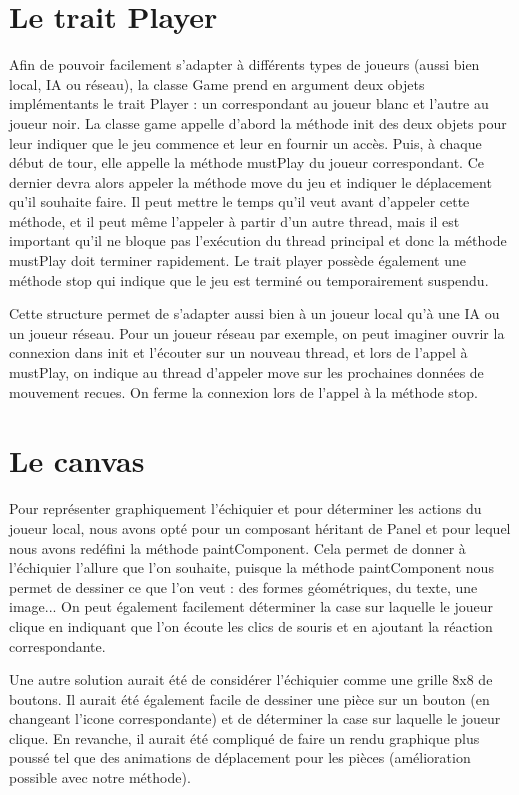 \documentclass[11pt]{article}
\begin{document}
\section{Le trait Player}

Afin de pouvoir facilement s'adapter à différents types de joueurs (aussi bien local, IA ou réseau), la classe Game prend en argument deux objets implémentants le trait Player : un correspondant au joueur blanc et l'autre au joueur noir.
La classe game appelle d'abord la méthode init des deux objets pour leur indiquer que le jeu commence et leur en fournir un accès.
Puis, à chaque début de tour, elle appelle la méthode mustPlay du joueur correspondant. Ce dernier devra alors appeler la méthode move du jeu et indiquer le déplacement qu'il souhaite faire. Il peut mettre le temps qu'il veut avant d'appeler cette méthode, et il peut même l'appeler à partir d'un autre thread, mais il est important qu'il ne bloque pas l'exécution du thread principal et donc la méthode mustPlay doit terminer rapidement.
Le trait player possède également une méthode stop qui indique que le jeu est terminé ou temporairement suspendu.\newline

Cette structure permet de s'adapter aussi bien à un joueur local qu'à une IA ou un joueur réseau. Pour un joueur réseau par exemple, on peut imaginer ouvrir la connexion dans init et l'écouter sur un nouveau thread, et lors de l'appel à mustPlay, on indique au thread d'appeler move sur les prochaines données de mouvement recues. On ferme la connexion lors de l'appel à la méthode stop.

\section{Le canvas}

Pour représenter graphiquement l'échiquier et pour déterminer les actions du joueur local, nous avons opté pour un composant héritant de Panel et pour lequel nous avons redéfini la méthode paintComponent. Cela permet de donner à l'échiquier l'allure que l'on souhaite, puisque la méthode paintComponent nous permet de dessiner ce que l'on veut : des formes géométriques, du texte, une image... On peut également facilement déterminer la case sur laquelle le joueur clique en indiquant que l'on écoute les clics de souris et en ajoutant la réaction correspondante.\newline

Une autre solution aurait été de considérer l'échiquier comme une grille 8x8 de boutons. Il aurait été également facile de dessiner une pièce sur un bouton (en changeant l'icone correspondante) et de déterminer la case sur laquelle le joueur clique. En revanche, il aurait été compliqué de faire un rendu graphique plus poussé tel que des animations de déplacement pour les pièces (amélioration possible avec notre méthode).
\end{document}
